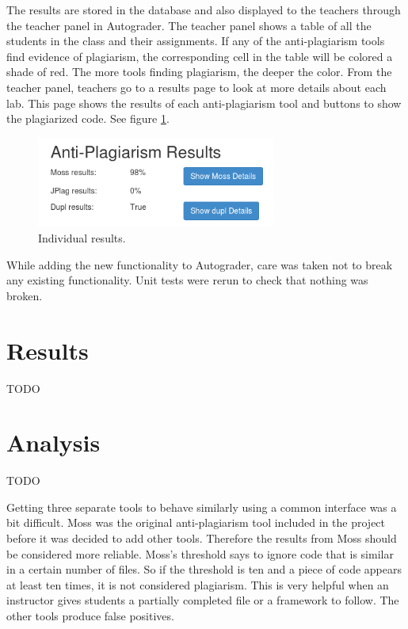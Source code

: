 \documentclass[10pt,journal,compsoc]{IEEEtran}
\begin{document}
		The results are stored in the database and also displayed to the teachers through the teacher panel in Autograder. The teacher panel shows a table of all the students in the class and their assignments. If any of the anti-plagiarism tools find evidence of plagiarism, the corresponding cell in the table will be colored a shade of red. The more tools finding plagiarism, the deeper the color. From the teacher panel, teachers go to a results page to look at more details about each lab. This page shows the results of each anti-plagiarism tool and buttons to show the plagiarized code. See figure \ref{fig:indResults}.
		
		\begin{figure}[h!]
			\includegraphics[width=0.7\textwidth]{IndividualResults.png}
			\caption{Individual results.}
			\label{fig:indResults}
		\end{figure}
		
		While adding the new functionality to Autograder, care was taken not to break any existing functionality. Unit tests were rerun to check that nothing was broken.
	
	\section{Results}
	TODO
	
	\section{Analysis}
	TODO
	
	Getting three separate tools to behave similarly using a common interface was a bit difficult. Moss was the original anti-plagiarism tool included in the project before it was decided to add other tools. Therefore the results from Moss should be considered more reliable. Moss's threshold says to ignore code that is similar in a certain number of files. So if the threshold is ten and a piece of code appears at least ten times, it is not considered plagiarism. This is very helpful when an instructor gives students a partially completed file or a framework to follow. The other tools produce false positives.
	
\end{document}
